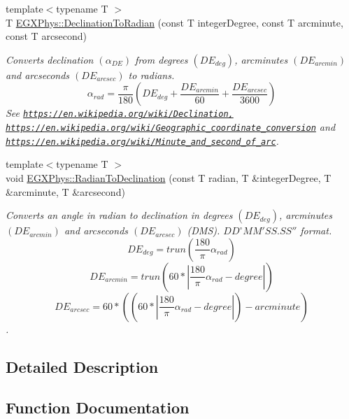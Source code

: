 \begin{DoxyCompactItemize}
{\footnotesize template$<$typename T $>$ }\\T \mbox{\hyperlink{group___e_g_x_phys-_astrophysics-_declination_ga384229c66d2ea6249c9609caa1ec9354}{E\+G\+X\+Phys\+::\+Declination\+To\+Radian}} (const T integer\+Degree, const T arcminute, const T arcsecond)
\begin{DoxyCompactList}\small\item\em Converts declination $(\alpha_{DE})$ from degrees $(DE_{deg})$, arcminutes $(DE_{arcmin})$ and arcseconds $(DE_{arcsec})$ to radians. \[\alpha_{rad}=\frac{\pi}{180}(DE_{deg} + \frac{DE_{arcmin}}{60} + \frac{DE_{arcsec}}{3600})\] See \href{https://en.wikipedia.org/wiki/Declination,}{\tt https\+://en.\+wikipedia.\+org/wiki/\+Declination,} \href{https://en.wikipedia.org/wiki/Geographic_coordinate_conversion}{\tt https\+://en.\+wikipedia.\+org/wiki/\+Geographic\+\_\+coordinate\+\_\+conversion} and \href{https://en.wikipedia.org/wiki/Minute_and_second_of_arc}{\tt https\+://en.\+wikipedia.\+org/wiki/\+Minute\+\_\+and\+\_\+second\+\_\+of\+\_\+arc}. \end{DoxyCompactList}\item 
{\footnotesize template$<$typename T $>$ }\\void \mbox{\hyperlink{group___e_g_x_phys-_astrophysics-_declination_gad12d59741171420fc420f3c469df4a82}{E\+G\+X\+Phys\+::\+Radian\+To\+Declination}} (const T radian, T \&integer\+Degree, T \&arcminute, T \&arcsecond)
\begin{DoxyCompactList}\small\item\em Converts an angle in radian to declination in degrees $(DE_{deg})$, arcminutes $(DE_{arcmin})$ and arcseconds $(DE_{arcsec})$ (D\+MS). ${DD}^{\circ}{MM}'{SS.SS}''$ format. \[DE_{deg}=trun(\frac{180}{\pi}\alpha_{rad})\] \[DE_{arcmin}=trun(60 * |\frac{180}{\pi}\alpha_{rad} - degree|)\] \[DE_{arcsec}=60 * ((60 * |\frac{180}{\pi}\alpha_{rad} - degree|)-arcminute)\]. \end{DoxyCompactList}\end{DoxyCompactItemize}


\subsection{Detailed Description}


\subsection{Function Documentation}
\mbox{\label{group___e_g_x_phys-_astrophysics-_declination_ga0c90ea1406801810378d9618553c9a9b}} 
